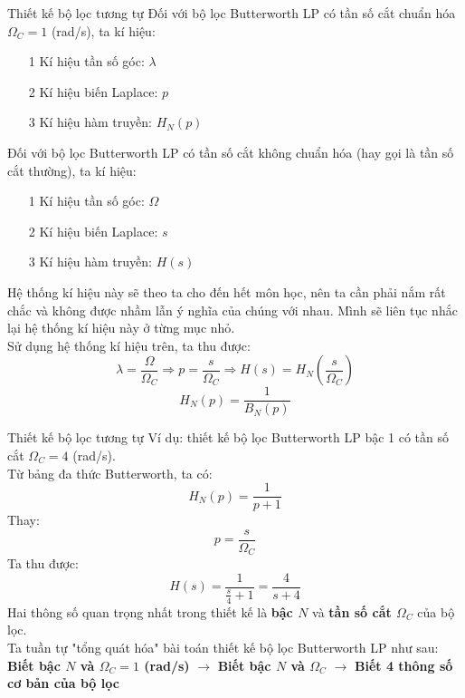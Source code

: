 \documentclass[8pt]{beamer}
\begin{document}
\begin{frame}{Thiết kế bộ lọc tương tự}
Đối với bộ lọc Butterworth LP có \alert{tần số cắt chuẩn hóa $\Omega_{C}=1$ (rad/s)}, ta kí hiệu:
\begin{enumerate}
	\item[1] Kí hiệu tần số góc: $\lambda$
	\item[2] Kí hiệu biến Laplace: $p$
	\item[3] Kí hiệu hàm truyền: $H_{N}(p)$
\end{enumerate}

Đối với bộ lọc Butterworth LP có \alert{tần số cắt không chuẩn hóa} (hay gọi là tần số cắt thường), ta kí hiệu:
\begin{enumerate}
	\item[1] Kí hiệu tần số góc: $\Omega$
	\item[2] Kí hiệu biến Laplace: $s$
	\item[3] Kí hiệu hàm truyền: $H(s)$
\end{enumerate}
Hệ thống kí hiệu này sẽ theo ta cho đến hết môn học, nên ta cần phải nắm rất chắc và không được nhầm lẫn ý nghĩa của chúng với nhau. Mình sẽ liên tục nhắc lại hệ thống kí hiệu này ở từng mục nhỏ.
\\Sử dụng hệ thống kí hiệu trên, ta thu được: 
$$\lambda=\frac{\Omega}{\Omega_{C}}\Rightarrow p=\frac{s}{\Omega_{C}}\Rightarrow H(s)=H_{N}\left(\frac{s}{\Omega_{C}}\right)$$
$$H_{N}(p)=\frac{1}{B_{N}(p)}$$
\end{frame}
\begin{frame}{Thiết kế bộ lọc tương tự}
	Ví dụ: thiết kế bộ lọc Butterworth LP bậc 1 có tần số cắt $\Omega_{C}=4$ (rad/s).	\\ Từ bảng đa thức Butterworth, ta có: $$H_{N}(p)=\frac{1}{p+1}$$ Thay: $$p=\frac{s}{\Omega_{C}}$$ Ta thu được: $$H(s)=\frac{1}{\frac{s}{4}+1}=\frac{4}{s+4}$$
Hai thông số quan trọng nhất trong thiết kế là \textbf{bậc $N$} và \textbf{tần số cắt $\Omega_{C}$} của bộ lọc.
\\ Ta tuần tự "tổng quát hóa" bài toán thiết kế bộ lọc Butterworth LP như sau:
\\ \textbf{Biết bậc $N$ và $\Omega_{C}=1$ (rad/s)} $\rightarrow$ \textbf{Biết bậc $N$ và $\Omega_{C}$} $\rightarrow$ \textbf{Biết 4 thông số cơ bản của bộ lọc}
\end{frame}
\end{document}
